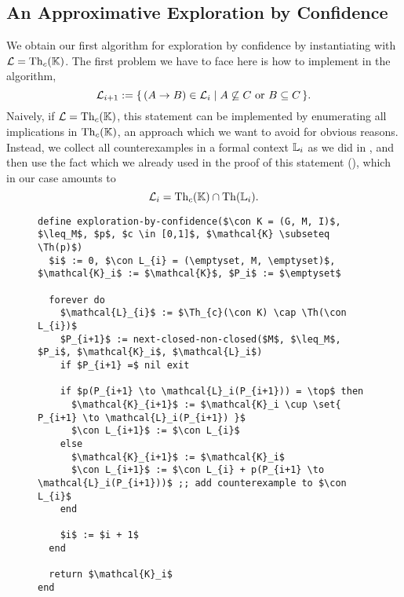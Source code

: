 \subsection{An Approximative Exploration by Confidence}
\label{sec:expl-conf-1}

We obtain our first algorithm for exploration by confidence by instantiating
 with $\mathcal{L} = \operatorname{Th}_{c}({\mathbb{K}})$.  The first problem
we have to face here is how to implement  in the
algorithm, \ie
\begin{equation*}
  \mathcal{L}_{i+1} := {\{\, (A \to B) \in \mathcal{L}_{i} \mid A \not\subseteq C \text{
      or } B \subseteq C \,\}}.
\end{equation*}
Naively, if $\mathcal{L} = \operatorname{Th}_{c}({\mathbb{K}})$, this statement can be implemented by
enumerating all implications in $\operatorname{Th}_{c}({\mathbb{K}})$, an approach which we want to avoid for
obvious reasons.  Instead, we collect all counterexamples in a formal context ${\mathbb{L}}_{i}$
as we did in , and then use the
fact which we already used in the proof of this statement (), which in our
case amounts to
\begin{equation*}
  \mathcal{L}_{i} = \operatorname{Th}_{c}({\mathbb{K}}) \cap \operatorname{Th}({\mathbb{L}}_{i}).
\end{equation*}


\begin{figure}[tp]
  \centering
  \begin{Algorithm}
    \label{alg:exploration-by-confidence-first-version}
    \hspace*{0cm}
\begin{lstlisting}
define exploration-by-confidence($\con K = (G, M, I)$, $\leq_M$, $p$, $c \in [0,1]$, $\mathcal{K} \subseteq \Th(p)$)
  $i$ := 0, $\con L_{i} = (\emptyset, M, \emptyset)$, $\mathcal{K}_i$ := $\mathcal{K}$, $P_i$ := $\emptyset$

  forever do
    $\mathcal{L}_{i}$ := $\Th_{c}(\con K) \cap \Th(\con L_{i})$
    $P_{i+1}$ := next-closed-non-closed($M$, $\leq_M$, $P_i$, $\mathcal{K}_i$, $\mathcal{L}_i$)
    if $P_{i+1} =$ nil exit

    if $p(P_{i+1} \to \mathcal{L}_i(P_{i+1})) = \top$ then
      $\mathcal{K}_{i+1}$ := $\mathcal{K}_i \cup \set{ P_{i+1} \to \mathcal{L}_i(P_{i+1}) }$
      $\con L_{i+1}$ := $\con L_{i}$
    else
      $\mathcal{K}_{i+1}$ := $\mathcal{K}_i$
      $\con L_{i+1}$ := $\con L_{i} + p(P_{i+1} \to \mathcal{L}_i(P_{i+1}))$ ;; add counterexample to $\con L_{i}$
    end

    $i$ := $i + 1$
  end

  return $\mathcal{K}_i$  
end
\end{lstlisting}
  \end{Algorithm}
\end{figure}

